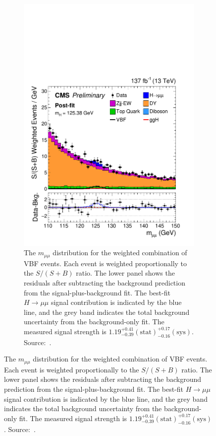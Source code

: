 \begin{figure}[htbp]
  \centering
  \begin{subfigure}[htbp]{0.48\textwidth}
    \centering
    \includegraphics[width=\textwidth]{figures_and_tables/theory/h_to_mumu_result.pdf}
    \caption{ The $m_{\mu\mu}$ distribution for the weighted combination of VBF events. Each event is weighted proportionally to the $S/(S + B)$ ratio. The lower panel shows the residuals after subtracting the background prediction from the signal-plus-background fit. The best-fit $H \rightarrow \mu\mu$ signal contribution is indicated by the blue line, and the grey band indicates the total background uncertainty from the background-only fit. The measured signal strength is ${1.19^{+0.41}_{-0.39}(\mathrm{stat})^{+0.17}_{-0.16}(\mathrm{sys})}$. Source:~\cite{cms_higgs_mumu}.}
  \label{h_to_mumu_result}

\end{subfigure}
\end{figure}
